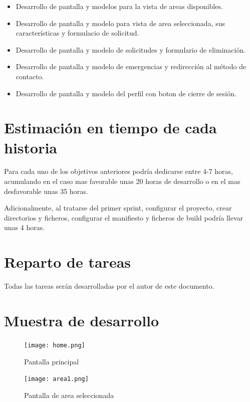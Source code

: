 \documentclass{article}
\begin{document}
    \begin{itemize}
        \item Desarrollo de pantalla y modelos para la vista de areas disponibles.
        \item Desarrollo de pantalla y modelo para vista de area seleccionada, sus características
            y formulacio de solicitud.
        \item Desarrollo de pantalla y modelo de solicitudes y formulario de eliminación.
        \item Desarrollo de pantalla y modelo de emergencias y redirección al método de contacto.
        \item Desarrollo de pantalla y modelo del perfil con boton de cierre de sesión.
    \end{itemize}

    \section{Estimación en tiempo de cada historia}

    Para cada uno de los objetivos anteriores podría dedicarse entre 4-7 horas, acumulando en el
     caso mas favorable unas 20 horas de desarrollo o en el mas desfavorable unas 35 horas.

    Adicionalmente, al tratarse del primer sprint, configurar el proyecto, crear directorios y
     ficheros, configurar el manifiesto y ficheros de build podría llevar unas 4 horas.

    \section{Reparto de tareas}

    Todas las tareas serán desarrolladas por el autor de este documento.

    \section{Muestra de desarrollo}

    \begin{figure}[H]
        \centerline{\texttt{[image: home.png]}}
        \caption{Pantalla principal}
        \label{fig:home}
    \end{figure}

    \begin{figure}[H]
        \centerline{\texttt{[image: area1.png]}}
        \caption{Pantalla de area seleccionada}
        \label{fig:area1}
    \end{figure}
\end{document}
